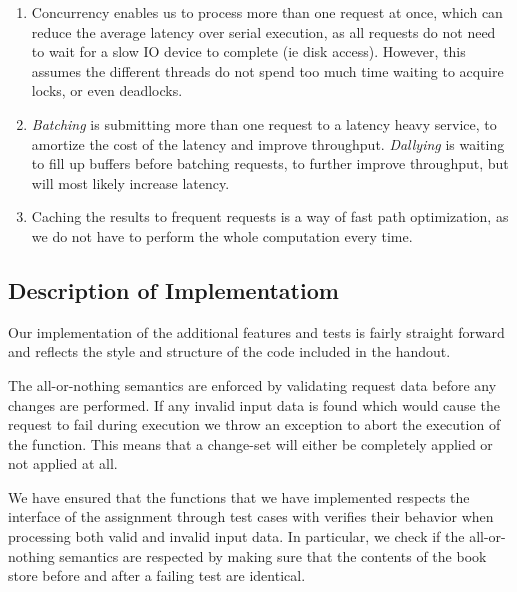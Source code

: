 \documentclass[11pt,a4paper,english]{article}
\begin{document}
\begin{enumerate}
\item Concurrency enables us to process more than one request at once, which can
  reduce the average latency over serial execution, as all requests do not need
  to wait for a slow IO device to complete (ie disk access). However, this
  assumes the different threads do not spend too much time waiting to acquire
  locks, or even deadlocks.

\item \emph{Batching} is submitting more than one request to a latency heavy
  service, to amortize the cost of the latency and improve
  throughput. \emph{Dallying} is waiting to fill up buffers before batching
  requests, to further improve throughput, but will most likely increase
  latency.

\item Caching the results to frequent requests is a way of fast path
  optimization, as we do not have to perform the whole computation every time.
\end{enumerate}

\newpage
\subsection{Description of Implementatiom}

Our implementation of the additional features and tests is fairly straight
forward and reflects the style and structure of the code included in the
handout.

The all-or-nothing semantics are enforced by validating request data before any
changes are performed. If any invalid input data is found which would cause the
request to fail during execution we throw an exception to abort the execution of
the function. This means that a change-set will either be completely applied or
not applied at all.

We have ensured that the functions that we have implemented respects the
interface of the assignment through test cases with verifies their behavior when
processing both valid and invalid input data. In particular, we check if the
all-or-nothing semantics are respected by making sure that the contents of the
book store before and after a failing test are identical.
\end{document}
